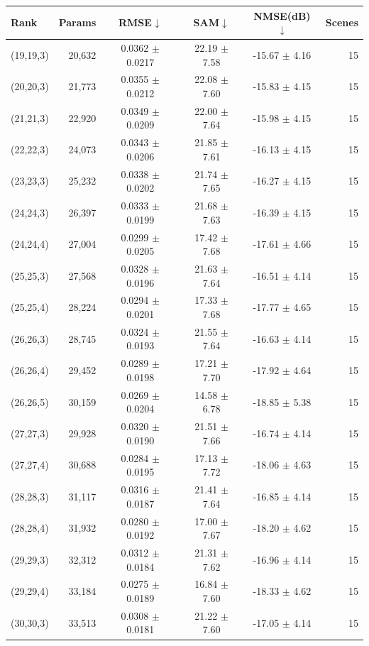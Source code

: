 \begin{tabular}{@{}l r c c c r@{}}
\toprule
Rank & Params & RMSE$\downarrow$ & SAM$\downarrow$ & NMSE(dB)$\downarrow$ & Scenes\\
\midrule
(19,19,3) & 20,632 & 0.0362 $\pm$ 0.0217 & 22.19 $\pm$ 7.58 & -15.67 $\pm$ 4.16 & 15\\
(20,20,3) & 21,773 & 0.0355 $\pm$ 0.0212 & 22.08 $\pm$ 7.60 & -15.83 $\pm$ 4.15 & 15\\
(21,21,3) & 22,920 & 0.0349 $\pm$ 0.0209 & 22.00 $\pm$ 7.64 & -15.98 $\pm$ 4.15 & 15\\
(22,22,3) & 24,073 & 0.0343 $\pm$ 0.0206 & 21.85 $\pm$ 7.61 & -16.13 $\pm$ 4.15 & 15\\
(23,23,3) & 25,232 & 0.0338 $\pm$ 0.0202 & 21.74 $\pm$ 7.65 & -16.27 $\pm$ 4.15 & 15\\
(24,24,3) & 26,397 & 0.0333 $\pm$ 0.0199 & 21.68 $\pm$ 7.63 & -16.39 $\pm$ 4.15 & 15\\
(24,24,4) & 27,004 & 0.0299 $\pm$ 0.0205 & 17.42 $\pm$ 7.68 & -17.61 $\pm$ 4.66 & 15\\
(25,25,3) & 27,568 & 0.0328 $\pm$ 0.0196 & 21.63 $\pm$ 7.64 & -16.51 $\pm$ 4.14 & 15\\
(25,25,4) & 28,224 & 0.0294 $\pm$ 0.0201 & 17.33 $\pm$ 7.68 & -17.77 $\pm$ 4.65 & 15\\
(26,26,3) & 28,745 & 0.0324 $\pm$ 0.0193 & 21.55 $\pm$ 7.64 & -16.63 $\pm$ 4.14 & 15\\
(26,26,4) & 29,452 & 0.0289 $\pm$ 0.0198 & 17.21 $\pm$ 7.70 & -17.92 $\pm$ 4.64 & 15\\
(26,26,5) & 30,159 & 0.0269 $\pm$ 0.0204 & 14.58 $\pm$ 6.78 & -18.85 $\pm$ 5.38 & 15\\
(27,27,3) & 29,928 & 0.0320 $\pm$ 0.0190 & 21.51 $\pm$ 7.66 & -16.74 $\pm$ 4.14 & 15\\
(27,27,4) & 30,688 & 0.0284 $\pm$ 0.0195 & 17.13 $\pm$ 7.72 & -18.06 $\pm$ 4.63 & 15\\
(28,28,3) & 31,117 & 0.0316 $\pm$ 0.0187 & 21.41 $\pm$ 7.64 & -16.85 $\pm$ 4.14 & 15\\
(28,28,4) & 31,932 & 0.0280 $\pm$ 0.0192 & 17.00 $\pm$ 7.67 & -18.20 $\pm$ 4.62 & 15\\
(29,29,3) & 32,312 & 0.0312 $\pm$ 0.0184 & 21.31 $\pm$ 7.62 & -16.96 $\pm$ 4.14 & 15\\
(29,29,4) & 33,184 & 0.0275 $\pm$ 0.0189 & 16.84 $\pm$ 7.60 & -18.33 $\pm$ 4.62 & 15\\
(30,30,3) & 33,513 & 0.0308 $\pm$ 0.0181 & 21.22 $\pm$ 7.60 & -17.05 $\pm$ 4.14 & 15\\

\end{tabular}
